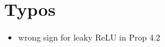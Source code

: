 \documentclass{article}
\begin{document}
\section{Typos}

\begin{itemize}
	\item wrong sign for leaky ReLU in Prop 4.2
\end{itemize}





\end{document}
